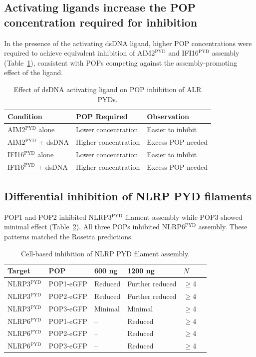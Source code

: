 \documentclass[11pt,a4paper]{article}
\begin{document}
\subsection{Activating ligands increase the POP concentration required for inhibition}

In the presence of the activating dsDNA ligand, higher POP concentrations were required to achieve equivalent inhibition of AIM2$^{\text{PYD}}$ and IFI16$^{\text{PYD}}$ assembly (Table~\ref{tab:dsdna}), consistent with POPs competing against the assembly-promoting effect of the ligand.

\begin{table}[htbp]
\centering
\caption{Effect of dsDNA activating ligand on POP inhibition of ALR PYDs.}
\label{tab:dsdna}
\begin{tabular}{lll}
\toprule
\textbf{Condition} & \textbf{POP Required} & \textbf{Observation} \\
\midrule
AIM2$^{\text{PYD}}$ alone & Lower concentration & Easier to inhibit \\
AIM2$^{\text{PYD}}$ + dsDNA & Higher concentration & Excess POP needed \\
IFI16$^{\text{PYD}}$ alone & Lower concentration & Easier to inhibit \\
IFI16$^{\text{PYD}}$ + dsDNA & Higher concentration & Excess POP needed \\
\bottomrule
\end{tabular}
\end{table}

\subsection{Differential inhibition of NLRP PYD filaments}

POP1 and POP2 inhibited NLRP3$^{\text{PYD}}$ filament assembly while POP3 showed minimal effect (Table~\ref{tab:nlrp}). All three POPs inhibited NLRP6$^{\text{PYD}}$ assembly. These patterns matched the Rosetta predictions.

\begin{table}[htbp]
\centering
\caption{Cell-based inhibition of NLRP PYD filament assembly.}
\label{tab:nlrp}
\small
\begin{tabular}{llllll}
\toprule
\textbf{Target} & \textbf{POP} & \textbf{600 ng} & \textbf{1200 ng} & \textbf{$N$} \\
\midrule
NLRP3$^{\text{PYD}}$ & POP1-eGFP & Reduced & Further reduced & $\geq$4 \\
NLRP3$^{\text{PYD}}$ & POP2-eGFP & Reduced & Further reduced & $\geq$4 \\
NLRP3$^{\text{PYD}}$ & POP3-eGFP & Minimal & Minimal & $\geq$4 \\
NLRP6$^{\text{PYD}}$ & POP1-eGFP & -- & Reduced & $\geq$4 \\
NLRP6$^{\text{PYD}}$ & POP2-eGFP & -- & Reduced & $\geq$4 \\
NLRP6$^{\text{PYD}}$ & POP3-eGFP & -- & Reduced & $\geq$4 \\
\bottomrule
\end{tabular}
\end{table}
\end{document}
